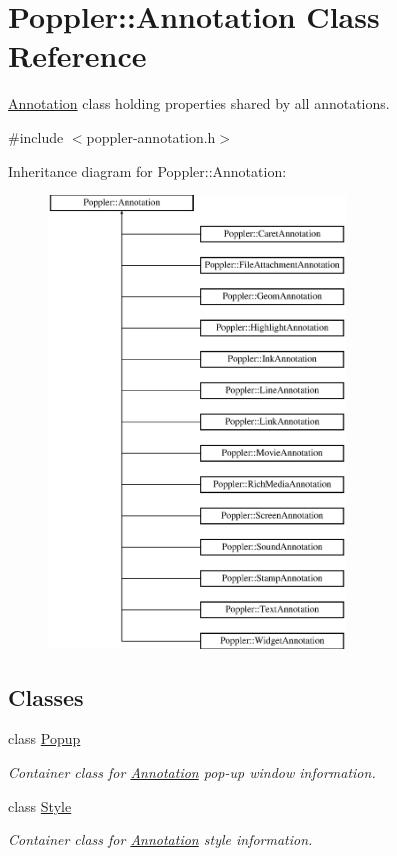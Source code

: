 \hypertarget{class_poppler_1_1_annotation}{}\section{Poppler\+:\+:Annotation Class Reference}
\label{class_poppler_1_1_annotation}


\hyperlink{class_poppler_1_1_annotation}{Annotation} class holding properties shared by all annotations.  




{\ttfamily \#include $<$poppler-\/annotation.\+h$>$}

Inheritance diagram for Poppler\+:\+:Annotation\+:\begin{figure}[H]
\begin{center}
\leavevmode
\includegraphics[height=12.000000cm]{class_poppler_1_1_annotation}
\end{center}
\end{figure}
\subsection*{Classes}
\begin{DoxyCompactItemize}
\item 
class \hyperlink{class_poppler_1_1_annotation_1_1_popup}{Popup}
\begin{DoxyCompactList}\small\item\em Container class for \hyperlink{class_poppler_1_1_annotation}{Annotation} pop-\/up window information. \end{DoxyCompactList}\item 
class \hyperlink{class_poppler_1_1_annotation_1_1_style}{Style}
\begin{DoxyCompactList}\small\item\em Container class for \hyperlink{class_poppler_1_1_annotation}{Annotation} style information. \end{DoxyCompactList}\end{DoxyCompactItemize}

